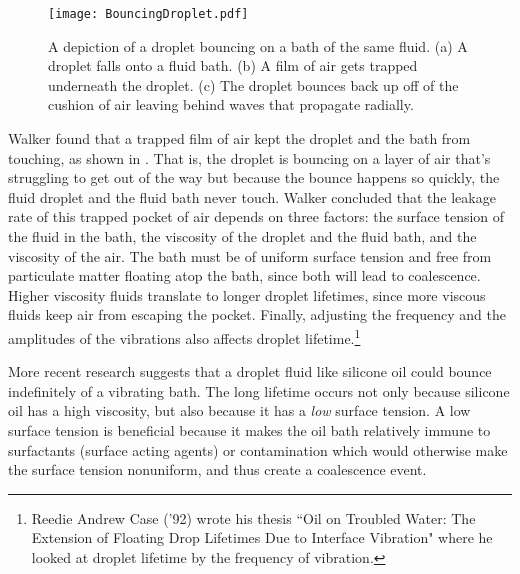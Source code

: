 \begin{figure}[h!]
	\centering
	\texttt{[image: BouncingDroplet.pdf]}
	\caption{A depiction of a droplet bouncing on a bath of the same fluid. (a) A droplet falls onto a fluid bath. (b) A film of air gets trapped underneath the droplet. (c) The droplet bounces back up off of the cushion of air leaving behind waves that propagate radially.}
	\label{bounce}
\end{figure}
	    
	    Walker found that a trapped film of air kept the droplet and the bath from touching, as shown in . That is, the droplet is bouncing on a layer of air that's struggling to get out of the way but because the bounce happens so quickly, the fluid droplet and the fluid bath never touch. Walker concluded that the leakage rate of this trapped pocket of air depends on three factors: the surface tension of the fluid in the bath, the viscosity of the droplet and the fluid bath, and the viscosity of the air. The bath must be of uniform surface tension and free from particulate matter floating atop the bath, since both will lead to coalescence. Higher viscosity fluids translate to longer droplet lifetimes, since more viscous fluids keep air from escaping the pocket. Finally, adjusting the frequency and the amplitudes of the vibrations also affects droplet lifetime.\footnote{Reedie Andrew Case ('92) wrote his thesis ``Oil on Troubled Water: The Extension of Floating Drop Lifetimes Due to Interface Vibration" where he looked at droplet lifetime by the frequency of vibration.}   
	     
	    More recent research suggests that a droplet fluid like silicone oil could bounce indefinitely of a vibrating bath. The long lifetime occurs not only because silicone oil has a high viscosity, but also because it has a \textit{low} surface tension. A low surface tension is beneficial because it makes the oil bath relatively immune to surfactants (surface acting agents) or contamination which would otherwise make the surface tension nonuniform, and thus create a coalescence event. 

